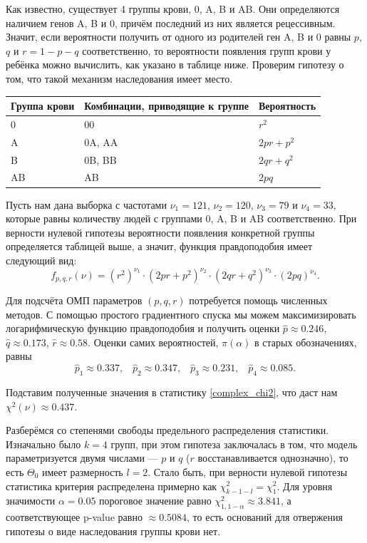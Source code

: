 \begin{example}
	Как известно, существует 4 группы крови, 0, A, B и AB. Они определяются наличием генов A, B и 0, причём последний из них является рецессивным. Значит, если вероятности получить от одного из родителей ген A, B и 0 равны $p$, $q$ и $r = 1 - p - q$ соответственно, то вероятности появления групп крови у ребёнка можно вычислить, как указано в таблице ниже. Проверим гипотезу о том, что такой механизм наследования имеет место. 
	
	\begin{center}
		\begin{tabular}{|m{}|m{}|m{}|}
	\hline
	     Группа крови & Комбинации, приводящие к группе & Вероятность \\
	     \hline
	     0 & 00 & $r^2$ \\
	     \hline
	     A & 0A, AA & $2pr + p^2$ \\
	     \hline
	     B & 0B, BB & $2qr + q^2$ \\
	     \hline
	     AB & AB & $2pq$ \\
	     \hline
	\end{tabular}
	\end{center}
	
	Пусть нам дана выборка с частотами $\nu_1 = 121$, $\nu_2 = 120$, $\nu_3 = 79$ и $\nu_4 = 33$, которые равны количеству людей с группами 0, A, B и AB соответственно. При верности нулевой гипотезы вероятности появления конкретной группы определяется таблицей выше, а значит, функция правдоподобия имеет следующий вид:
	\[
	f_{p, q, r}(\nu) = (r^2)^{\nu_1} \cdot (2pr+p^2)^{\nu_2} \cdot (2qr+q^2)^{\nu_3} \cdot (2pq)^{\nu_4}.
	\]
	
	Для подсчёта ОМП параметров $(p, q, r)$ потребуется помощь численных методов. С помощью простого градиентного спуска мы можем максимизировать логарифмическую функцию правдоподобия и получить оценки $\widehat{p} \approx 0.246$, $\widehat{q} \approx 0.173$, $\widehat{r} \approx 0.58$. Оценки самих вероятностей, $\pi(\alpha)$ в старых обозначениях, равны
	\[
	\widehat{p}_1 \approx 0.337, \;\;\; \widehat{p}_2 \approx 0.347,\;\;\; \widehat{p}_3 \approx 0.231, \;\;\; \widehat{p}_4 \approx 0.085.
	\]
	
	Подставим полученные значения в статистику \eqref{complex_chi2}, что даст нам $\chi^2(\nu) \approx 0.437$.
	
	Разберёмся со степенями свободы предельного распределения статистики. Изначально было $k=4$ групп, при этом гипотеза заключалась в том, что модель параметризуется двумя числами --- $p$ и $q$ ($r$ восстанавливается однозначно), то есть $\Theta_0$ имеет размерность $l = 2$. Стало быть, при верности нулевой гипотезы статистика критерия распределена примерно как $\chi^2_{k-1-l} = \chi^2_1$. Для уровня значимости $\alpha = 0.05$ пороговое значение равно $\chi^2_{1,1-\alpha} \approx 3.841$, а соответствующее p-value равно $\approx 0.5084$, то есть оснований для отвержения гипотезы о виде наследования группы крови нет.
\end{example}

